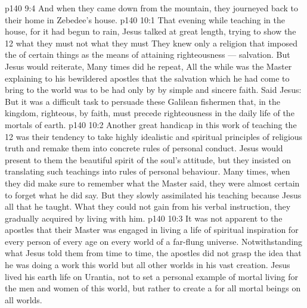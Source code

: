 \vs p140 9:4 \pc And when they came down from the mountain, they journeyed back to their home in Zebedee’s house.
\vs p140 10:1 That evening while teaching in the house, for it had begun to rain, Jesus talked at great length, trying to show the 12 what they must  not what they must  They knew only a religion that imposed the  of certain things as the means of attaining righteousness --- salvation. But Jesus would reiterate,  Many times did he repeat,  All the while was the Master explaining to his bewildered apostles that the salvation which he had come to bring to the world was to be had only by  by simple and sincere faith. Said Jesus:  But it was a difficult task to persuade these Galilean fishermen that, in the kingdom,  righteous, by faith, must precede  righteousness in the daily life of the mortals of earth.
\vs p140 10:2 \pc Another great handicap in this work of teaching the 12 was their tendency to take highly idealistic and spiritual principles of religious truth and remake them into concrete rules of personal conduct. Jesus would present to them the beautiful spirit of the soul’s attitude, but they insisted on translating such teachings into rules of personal behaviour. Many times, when they did make sure to remember what the Master said, they were almost certain to forget what he did  say. But they slowly assimilated his teaching because Jesus  all that he taught. What they could not gain from his verbal instruction, they gradually acquired by living with him.
\vs p140 10:3 It was not apparent to the apostles that their Master was engaged in living a life of spiritual inspiration for every person of every age on every world of a far\hyp{}flung universe. Notwithstanding what Jesus told them from time to time, the apostles did not grasp the idea that he was doing a work  this world but  all other worlds in his vast creation. Jesus lived his earth life on Urantia, not to set a personal example of mortal living for the men and women of this world, but rather to create a  for all mortal beings on all worlds.
